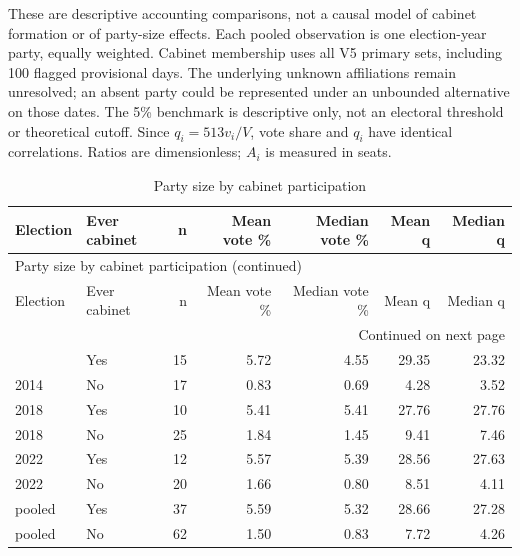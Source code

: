 \noindent These are descriptive accounting comparisons, not a causal model of cabinet formation or of party-size effects. Each pooled observation is one election-year party, equally weighted. Cabinet membership uses all V5 primary sets, including 100 flagged provisional days. The underlying unknown affiliations remain unresolved; an absent party could be represented under an unbounded alternative on those dates. The 5\% benchmark is descriptive only, not an electoral threshold or theoretical cutoff. Since $q_i=513v_i/V$, vote share and $q_i$ have identical correlations. Ratios are dimensionless; $A_i$ is measured in seats.
\begingroup
\scriptsize
\setlength{\tabcolsep}{3.2pt}
\begin{longtable}{llrrrrr}
\caption{Party size by cabinet participation}\label{tab:report-party-size-cabinet} \\
\toprule
Election & Ever cabinet & n & Mean vote \% & Median vote \% & Mean q & Median q \\
\midrule
\endfirsthead
\multicolumn{7}{l}{\footnotesize Party size by cabinet participation (continued)} \\
\toprule
Election & Ever cabinet & n & Mean vote \% & Median vote \% & Mean q & Median q \\
\midrule
\endhead
\midrule
\multicolumn{7}{r}{\footnotesize Continued on next page} \\
\endfoot
\bottomrule
\endlastfoot
2014 & Yes & 15 & 5.72 & 4.55 & 29.35 & 23.32 \\
2014 & No & 17 & 0.83 & 0.69 & 4.28 & 3.52 \\
2018 & Yes & 10 & 5.41 & 5.41 & 27.76 & 27.76 \\
2018 & No & 25 & 1.84 & 1.45 & 9.41 & 7.46 \\
2022 & Yes & 12 & 5.57 & 5.39 & 28.56 & 27.63 \\
2022 & No & 20 & 1.66 & 0.80 & 8.51 & 4.11 \\
pooled & Yes & 37 & 5.59 & 5.32 & 28.66 & 27.28 \\
pooled & No & 62 & 1.50 & 0.83 & 7.72 & 4.26 \\
\end{longtable}
\endgroup

